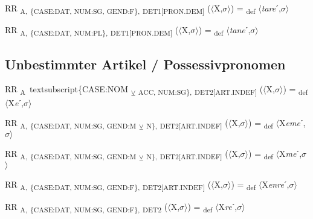 {\begin{exe}
 RR \textsubscript{A,} \textsubscript{\{CASE:DAT, NUM:SG, GEND:F\},} \textsubscript{DET1[PRON.DEM]} ($\langle$X,$\sigma $$\rangle$) = \textsubscript{def} $\langle$\textit{tare}ˊ,$\sigma $$\rangle$
\end{exe}

\begin{exe}
 RR \textsubscript{A,} \textsubscript{\{CASE:DAT, NUM:PL\},} \textsubscript{DET1[PRON.DEM]} ($\langle$X,$\sigma $$\rangle$) = \textsubscript{def} $\langle$\textit{tane}ˊ,$\sigma $$\rangle$
\end{exe}

\subsection{Unbestimmter Artikel / Possessivpronomen}

\begin{exe}
 RR \textsubscript{A} \,textsubscript{\{CASE:NOM} \textsubscript{${\veebar}$}\textsubscript{ ACC, NUM:SG\},} \textsubscript{DET2[ART.INDEF]} ($\langle$X,$\sigma $$\rangle$) = \textsubscript{def} $\langle$X\textit{e}ˊ,$\sigma $$\rangle$
\end{exe}

\begin{exe}
 RR \textsubscript{A,} \textsubscript{\{CASE:DAT, NUM:SG, GEND:M} \textsubscript{${\veebar}$}\textsubscript{ N\},} \textsubscript{DET2[ART.INDEF]} ($\langle$X,$\sigma $$\rangle$) = \textsubscript{def} $\langle$X\textit{eme}ˊ,$\sigma $$\rangle$
\end{exe}

\begin{exe}
 RR \textsubscript{A,} \textsubscript{\{CASE:DAT, NUM:SG, GEND:M} \textsubscript{${\veebar}$}\textsubscript{ N\},} \textsubscript{DET2[ART.INDEF]} ($\langle$X,$\sigma $$\rangle$) = \textsubscript{def} $\langle$X\textit{me}ˊ,$\sigma $$\rangle$
\end{exe}

\begin{exe}
 RR \textsubscript{A,} \textsubscript{\{CASE:DAT, NUM:SG, GEND:F\},} \textsubscript{DET2[ART.INDEF]} ($\langle$X,$\sigma $$\rangle$) = \textsubscript{def} $\langle$X\textit{enre}ˊ,$\sigma $$\rangle$
\end{exe}

\begin{exe}
 RR \textsubscript{A,} \textsubscript{\{CASE:DAT, NUM:SG, GEND:F\},} \textsubscript{DET2} ($\langle$X,$\sigma $$\rangle$) = \textsubscript{def} $\langle$X\textit{re}ˊ,$\sigma $$\rangle$
\end{exe}

}
